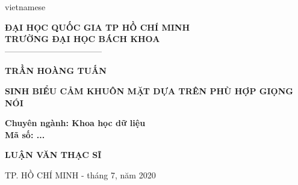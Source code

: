 \begin{titlepage}
\vspace*{1\bigskipamount}
\begin{otherlanguage*}{vietnamese}
\thispagestyle{empty}
\thisfancypage{
\setlength{\fboxsep}{5pt}
\fbox}{}

\begin{center}
\makeatletter
\fontsize{12}{12}\textbf{ĐẠI HỌC QUỐC GIA TP HỒ CHÍ MINH}\\
\fontsize{14}{14}\textbf{TRƯỜNG ĐẠI HỌC BÁCH KHOA}\\
\fontsize{14}{14} -----------------------------------
\makeatother

\vspace{4cm}

{\makeatletter
\fontsize{16}{16}\textbf{TRẦN HOÀNG TUẤN}\\
\makeatother}

\vspace{4cm}

{\makeatletter
\fontsize{18}{18}\textbf{SINH BIỂU CẢM KHUÔN MẶT DỰA TRÊN PHÙ HỢP GIỌNG NÓI}\\
\makeatother}
\end{center}

{\makeatletter
\begin{flushleft}
\hspace{2cm}\fontsize{14}{14}\textbf{Chuyên ngành: Khoa học dữ liệu}\\
\hspace{2cm}\fontsize{14}{14}\textbf{Mã số: ...}\\
\end{flushleft}
\makeatother}

\begin{center}
\vspace{1.2cm}
{\makeatletter
\fontsize{18}{18}\textbf{LUẬN VĂN THẠC SĨ}\\
\makeatother}


\vspace{8cm}
{\makeatletter
\fontsize{12}{12} TP. HỒ CHÍ MINH - tháng 7, năm 2020\\
\makeatother}
\end{center}

\end{otherlanguage*}
\end{titlepage}

